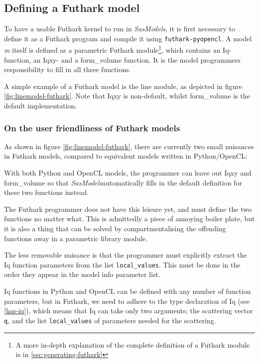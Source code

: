 \documentclass[11pt]{article}
\newcommand{\sasmodels}{\textit{SasModels}}
\begin{document}
\subsection{Defining a Futhark model}
\label{sec:defining-futhark-model}
To have a usable Futhark kernel to run in \sasmodels, it is first necessary to
define it as a Futhark program and compile it using \texttt{futhark-pyopencl}.
A model \textit{m} itself is defined as a parametric Futhark module\footnote{
  A more in-depth explanation of the complete definition of a Futhark module is 
  in \ref{sec:generating-futhark}},
which contains an Iq-function, an Iqxy- and a form\_volume function.
It is the model programmers responsibility to fill in all three functions.


A simple example of a Futhark model is the line module, 
as depicted in figure \ref{fig:linemodel-futhark}.
Note that Iqxy is non-default, whilst form\_volume is the default 
implementation.


\subsubsection{On the user friendliness of Futhark models}
As shown in figure \ref{fig:linemodel-futhark}, there are currently two small 
nuisances in Futhark models, compared to equivalent models written in
Python/OpenCL:

With both Python and OpenCL models, the programmer can leave out Iqxy and 
form\_volume so that \sasmodels automatically fills in the default definition
for these two functions instead.

The Futhark programmer does not have this leisure yet, and must define the two
functions no matter what. This is admittedly a piece of annoying boiler plate,
but it is also a thing that can be solved by compartmentalising the offending
functions away in a parametric library module.

The less removable nuisance is that the programmer must explicitly extract the
Iq function parameters from the list \texttt{local\_values}. This must be done
in the order they appear in the model info parameter list.

Iq functions in Python and OpenCL can be defined with any number of function 
parameters, but in Futhark, we need to adhere to the type declaration of Iq 
(see \ref{has-iq}), which means that Iq can take only two arguments; the 
scattering vector \texttt{q}, and the list \texttt{local\_values} of parameters
needed for the scattering.
\end{document}
